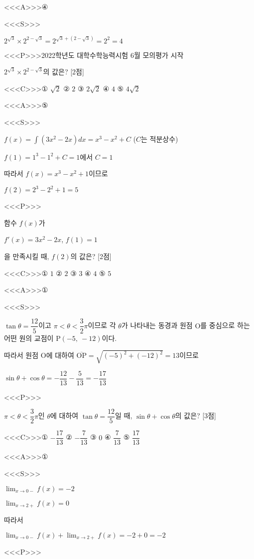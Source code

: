 \documentclass{oblivoir}
\begin{document}
<<<A>>>④

<<<S>>>

$2^{\sqrt{3}}\times 2^{2-\sqrt{3}}$$=2^{\sqrt{3}+(2-\sqrt{3})}$$=2^{2}$$=4$

<<<P>>>2022학년도 대학수학능력시험 6월 모의평가 시작

$2^{\sqrt{3}}\times 2^{2-\sqrt{3}}$의 값은? [2점]

<<<C>>>① $\sqrt{2}$ ② $2$ ③ $2\sqrt{2}$ ④ $4$ ⑤ $4\sqrt{2}$

<<<A>>>⑤

<<<S>>>

$f(x)$$=\displaystyle\int(3x^{2}-2x)dx$$=x^{3}-x^{2}+C$ ($C$는 적분상수)

$f(1)=1^{3}-1^{2}+C=1$에서 $C=1$

따라서 $f(x)= x^{3}-x^{2}+1$이므로

$f(2)= 2^{3}-2^{2}+1=5$

<<<P>>>

함수 $f(x)$가

$f'(x)=3x^{2}-2x$, $f(1)=1$

을 만족시킬 때, $f(2)$의 값은? [2점]

<<<C>>>① $1$ ② $2$ ③ $3$ ④ $4$ ⑤ $5$

<<<A>>>①

<<<S>>>

$\tan\theta =\dfrac{12}{5}$이고 $\pi < \theta < \dfrac{3}{2}\pi$이므로 각 $\theta$가 나타내는 동경과 원점 $\mathrm{O}$를 중심으로 하는 어떤 원의 교점이 $\mathrm{P}(-5,\:-12)$이다.

따라서 원점 $\mathrm{O}$에 대하여 $\overline{\mathrm{OP}}=\sqrt{(-5)^{2}+(-12)^{2}}=13$이므로

$\sin\theta +\cos\theta =-\dfrac{12}{13}-\dfrac{5}{13}= -\dfrac{17}{13}$

<<<P>>>

$\pi < \theta < \dfrac{3}{2}\pi$인 $\theta$에 대하여 $\tan\theta =\dfrac{12}{5}$일 때, $\sin\theta +\cos\theta$의 값은? [3점]

<<<C>>>① $-\dfrac{17}{13}$ ② $-\dfrac{7}{13}$ ③ $0$ ④ $\dfrac{7}{13}$ ⑤ $\dfrac{17}{13}$

<<<A>>>①

<<<S>>>

$\displaystyle\lim_{x\to 0-}f(x)= -2$

$\displaystyle\lim_{x\to 2+}f(x)=0$

따라서

$\displaystyle\lim_{x\to 0-}f(x)+\displaystyle\lim_{x\to 2+}f(x)= -2+0= -2$

<<<P>>>
\end{document}
